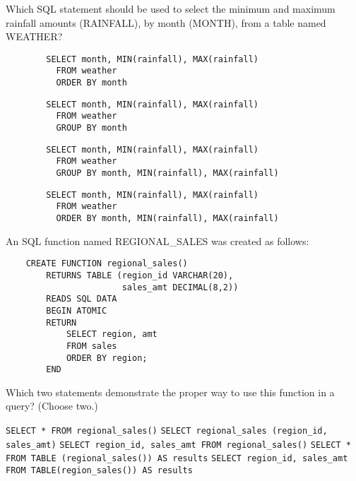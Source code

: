 \documentclass[answers, 11pt]{exam}
\begin{document}
\begin{questions}
\newpage
\question[1]
Which SQL statement should be used to select the minimum and maximum rainfall amounts (RAINFALL), by 
month (MONTH), from a table named WEATHER?
\begin{choices}
\choice \begin{verbatim}
		SELECT month, MIN(rainfall), MAX(rainfall)
		  FROM weather
		  ORDER BY month
		\end{verbatim}
\CorrectChoice \begin{verbatim}
		SELECT month, MIN(rainfall), MAX(rainfall)
		  FROM weather
		  GROUP BY month
		\end{verbatim}
\choice \begin{verbatim}
		SELECT month, MIN(rainfall), MAX(rainfall)
		  FROM weather
		  GROUP BY month, MIN(rainfall), MAX(rainfall)
		\end{verbatim}
\choice \begin{verbatim}
		SELECT month, MIN(rainfall), MAX(rainfall)
		  FROM weather
		  ORDER BY month, MIN(rainfall), MAX(rainfall)
		\end{verbatim}
\end{choices}

\question[1]
An SQL function named REGIONAL\_SALES was created as follows:
	\begin{verbatim}
	CREATE FUNCTION regional_sales()
		RETURNS TABLE (region_id VARCHAR(20),
					   sales_amt DECIMAL(8,2))
		READS SQL DATA
		BEGIN ATOMIC
		RETURN
			SELECT region, amt
			FROM sales
			ORDER BY region;
		END
	\end{verbatim}
Which two statements demonstrate the proper way to use this function in a query? (Choose two.)
\begin{choices}
\choice \texttt{SELECT * FROM regional\_sales()}
\choice \texttt{SELECT regional\_sales (region\_id, sales\_amt)}
\choice \texttt{SELECT region\_id, sales\_amt FROM regional\_sales()}
\CorrectChoice \texttt{SELECT * FROM TABLE (regional\_sales()) AS results}
\CorrectChoice \texttt{SELECT region\_id, sales\_amt FROM TABLE(region\_sales()) AS results}
\end{choices}


\end{questions}
\end{document}
